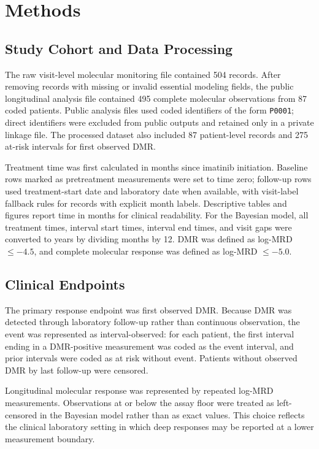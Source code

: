 \documentclass[11pt]{article}
\begin{document}
\section{Methods}

\subsection{Study Cohort and Data Processing}

The raw visit-level molecular monitoring file contained 504 records. After removing records with missing or invalid essential modeling fields, the public longitudinal analysis file contained 495 complete molecular observations from 87 coded patients. Public analysis files used coded identifiers of the form \texttt{P0001}; direct identifiers were excluded from public outputs and retained only in a private linkage file. The processed dataset also included 87 patient-level records and 275 at-risk intervals for first observed DMR.

Treatment time was first calculated in months since imatinib initiation. Baseline rows marked as pretreatment measurements were set to time zero; follow-up rows used treatment-start date and laboratory date when available, with visit-label fallback rules for records with explicit month labels. Descriptive tables and figures report time in months for clinical readability. For the Bayesian model, all treatment times, interval start times, interval end times, and visit gaps were converted to years by dividing months by 12. DMR was defined as log-MRD \(\leq -4.5\), and complete molecular response was defined as log-MRD \(\leq -5.0\).



\subsection{Clinical Endpoints}

The primary response endpoint was first observed DMR. Because DMR was detected through laboratory follow-up rather than continuous observation, the event was represented as interval-observed: for each patient, the first interval ending in a DMR-positive measurement was coded as the event interval, and prior intervals were coded as at risk without event. Patients without observed DMR by last follow-up were censored.

Longitudinal molecular response was represented by repeated log-MRD measurements. Observations at or below the assay floor were treated as left-censored in the Bayesian model rather than as exact values. This choice reflects the clinical laboratory setting in which deep responses may be reported at a lower measurement boundary.
\end{document}
